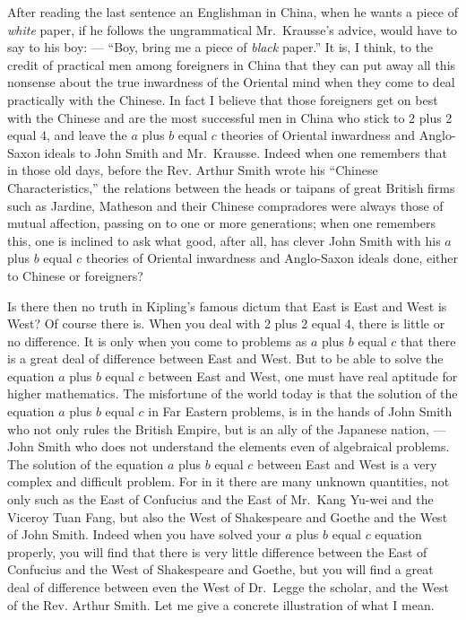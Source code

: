 After reading the last sentence an Englishman in China, when he wants a piece of \emph{white} paper, if he follows the ungrammatical Mr.~Krausse's advice, would have to say to his boy: --- ``Boy, bring me a piece of \emph{black} paper.''
It is, I think, to the credit of practical men among foreigners in China that they can put away all this nonsense about the true inwardness of the Oriental mind when they come to deal practically with the Chinese.
In fact I believe that those foreigners get on best with the Chinese and are the most successful men in China who stick to 2 plus 2 equal 4, and leave the $a$ plus $b$ equal $c$ theories of Oriental inwardness and Anglo-Saxon ideals to John Smith and Mr.~Krausse.
Indeed when one remembers that in those old days, before the Rev. Arthur Smith wrote his ``Chinese Characteristics,'' the relations between the heads or taipans of great British firms such as Jardine, Matheson and their Chinese compradores were always those of mutual affection, passing on to one or more generations;
when one remembers this, one is inclined to ask what good, after all, has clever John Smith with his $a$ plus $b$ equal $c$ theories of Oriental inwardness and Anglo-Saxon ideals done, either to Chinese or foreigners?

Is there then no truth in Kipling's famous dictum that East is East and West is West?
Of course there is.
When you deal with 2 plus 2 equal 4, there is little or no difference.
It is only when you come to problems as $a$ plus $b$ equal $c$ that there is a great deal of difference between East and West.
But to be able to solve the equation $a$ plus $b$ equal $c$ between East and West, one must have real aptitude for higher mathematics.
The misfortune of the world today is that the solution of the equation $a$ plus $b$ equal $c$ in Far Eastern problems, is in the hands of John Smith who not only rules the British Empire, but is an ally of the Japanese nation, --- John Smith who does not understand the elements even of algebraical problems.
The solution of the equation $a$ plus $b$ equal $c$ between East and West is a very complex and difficult problem.
For in it there are many unknown quantities, not only such as the East of Confucius and the East of Mr.~Kang Yu-wei and the Viceroy Tuan Fang, but also the West of Shakespeare and Goethe and the West of John Smith.
Indeed when you have solved your $a$ plus $b$ equal $c$ equation properly, you will find that there is very little difference between the East of Confucius and the West of Shakespeare and Goethe, but you will find a great deal of difference between even the West of Dr.~Legge the scholar, and the West of the Rev. Arthur Smith.
Let me give a concrete illustration of what I mean.


